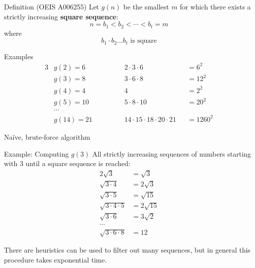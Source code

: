 \documentclass{beamer}
\begin{document}
\begin{frame}{Definition (OEIS A006255)}
  Let $g(n)$ be the smallest $m$ for which there exists a strictly increasing \textbf{square sequence}:
    \[n = b_1 < b_2 < \cdots < b_t = m\]
  where
    \[b_1 \cdot b_2 \hdots b_t \text{ is square}\]

  \begin{block}{Examples}
    \setlength\abovedisplayskip{-10pt}
    \begin{alignat*}{3}
      & g(2) = 6  && \qquad\quad 2 \cdot 3 \cdot 6  &&= 6^2  \\
      & g(3) = 8  && \qquad\quad 3 \cdot 6 \cdot 8  &&= 12^2 \\
      & g(4) = 4  && \qquad\quad 4                  &&= 2^2  \\
      & g(5) = 10 && \qquad\quad 5 \cdot 8 \cdot 10 &&= 20^2 \\
      & \cdots    &&                                &&       \\
      & g(14) = 21 && \qquad\quad 14 \cdot 15 \cdot 18 \cdot 20 \cdot 21 &&= 1260^2
    \end{alignat*}
  \end{block}
\end{frame}

\begin{frame}{Naïve, brute-force algorithm}
  \begin{block}{Example: Computing $g(3)$}
    All strictly increasing sequences of numbers starting with $3$
    until a square sequence is reached:
    \begin{alignat*}{2}
      \sqrt{3}             	   &= \sqrt{3}\\
      \sqrt{3 \cdot 4}         &= 2\sqrt{3}\\
      \sqrt{3 \cdot 5}         &= \sqrt{15}\\
      \sqrt{3 \cdot 4 \cdot 5} &= 2\sqrt{15}\\
      \sqrt{3 \cdot 6}         &= 3\sqrt{2}\\
      \cdots \\
      \sqrt{3 \cdot 6 \cdot 8} &= 12
    \end{alignat*}

    There are heuristics can be used to filter out many sequences, but in
    general this procedure takes exponential time.
  \end{block}
\end{frame}
\end{document}
